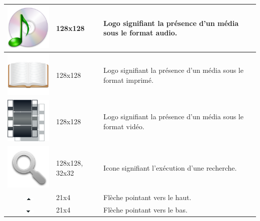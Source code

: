 \documentclass[letter, 11pt, draft]{report}
\begin{document}
\begin{table}[ht]
\begin{center}
\begin{tabular}{|c|l|l|}
		\includegraphics[scale=0.3]{audio.png} 				& 128x128 			& Logo signifiant la présence d'un média sous le format audio. \\ \hline
		\includegraphics[scale=0.3]{imprime.png} 			& 128x128 			& Logo signifiant la présence d'un média sous le format imprimé. \\ \hline
		\includegraphics[scale=0.3]{video.png} 				& 128x128 			& Logo signifiant la présence d'un média sous le format vidéo. \\ \hline
		\includegraphics[scale=0.3]{search.png} 			& 128x128, 32x32 	& Icone signifiant l'exécution d'une recherche. \\ \hline
		\includegraphics{down.png} 							& 21x4 				& Flèche pointant vers le haut. \\ \hline
		\includegraphics{up.png} 							& 21x4 				& Flèche pointant vers le bas. \\ \hline

\end{tabular}
\end{center}
\end{table}
\end{document}

